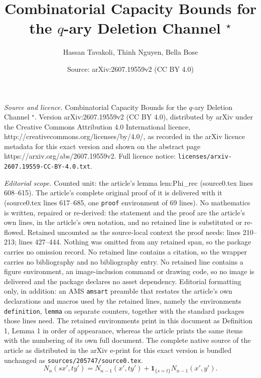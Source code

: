 \documentclass[10pt,a4paper]{amsart}
\title{Combinatorial Capacity Bounds for the $q$-ary Deletion Channel $^{\star}$}
\author{Hassan Tavakoli, Thinh Nguyen, Bella Bose}
\date{Source: arXiv:2607.19559v2 (CC BY 4.0)}
\begin{document}
\maketitle

\noindent\emph{Source and licence.} Combinatorial Capacity Bounds for the $q$-ary Deletion Channel $^{\star}$. Version arXiv:2607.19559v2 (CC BY 4.0), distributed by arXiv under the Creative Commons Attribution 4.0 International licence, http://creativecommons.org/licenses/by/4.0/, as recorded in the arXiv licence metadata for this exact version and shown on the abstract page https://arxiv.org/abs/2607.19559v2. Full licence notice: \texttt{licenses/arxiv-2607.19559-CC-BY-4.0.txt}.\par\smallskip

\noindent\textit{Editorial scope.} Counted unit: the article's lemma lem:Phi\_rec (source0.tex lines 608--615). The article's complete original proof of it is delivered with it (source0.tex lines 617--685, one \texttt{proof} environment of 69 lines). No mathematics is written, repaired or re-derived: the statement and the proof are the article's own lines, in the article's own notation, and no retained line is substituted or re-flowed.  Retained uncounted as the source-local context the proof needs: lines 210--213; lines 427--444.  Nothing was omitted from any retained span, so the package carries no omission record.  No retained line contains a citation, so the wrapper carries no bibliography and no bibliography entry.  No retained line contains a figure environment, an image-inclusion command or drawing code, so no image is delivered and the package declares no asset dependency.  Editorial formatting only, in addition: an AMS \texttt{amsart} preamble that restates the article's own declarations and macros used by the retained lines, namely the environments \texttt{definition}, \texttt{lemma} on separate counters, together with the standard packages those lines need.  The retained environments print in this document as Definition 1, Lemma 1 in order of appearance, whereas the article prints the same items with the numbering of its own full document.  The complete native source of the article as distributed in the arXiv e-print for this exact version is bundled unchanged as \texttt{sources/205747/source0.tex}.
\begin{equation}
  N_n(sx',ty')=N_{n-1}(x',ty')+\mathbf{1}_{\{s=t\}}N_{n-1}(x',y').
  \label{eq:rec}
\end{equation}
\end{document}
